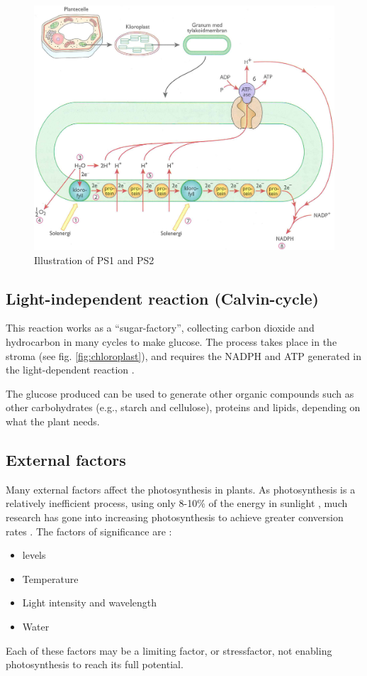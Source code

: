 \begin{figure}
\centering
\includegraphics[width=\textwidth]{img/photosynthesis/light_dependent.png}
\caption{Illustration of PS1 and PS2 \citep{bios}}
\label{fig:photosystem}
\end{figure}

\subsection{Light-independent reaction (Calvin-cycle)}
This reaction works as a “sugar-factory”, collecting carbon dioxide and hydrocarbon in many cycles to make glucose. The process takes place in the stroma (see fig. \ref{fig:chloroplast}), and requires the NADPH and ATP generated in the light-dependent reaction \citep{bi2}. 

The glucose produced can be used to generate other organic compounds such as other carbohydrates (e.g., starch and cellulose), proteins and lipids, depending on what the plant needs.

\subsection{External factors}
Many external factors affect the photosynthesis in plants. As photosynthesis is a relatively inefficient process, using only 8-10\% of the energy in sunlight \citetext{Long et. al, 2006; Zhu et. al, 2010, referenced in \citealp{kirschbaum2011does}}, much research has gone into increasing photosynthesis to achieve greater conversion rates \citetext{Reynolds et al., 2000; Sinclair et al., 2004; Long et al., 2006; Zhu et al., 2010, referenced in \citealp{kirschbaum2011does}}. The factors of significance are \citep{bios}:
\begin{itemize}
\item {} levels
\item Temperature
\item Light intensity and wavelength
\item Water
\end{itemize}
Each of these factors may be a limiting factor, or stressfactor, not enabling photosynthesis to reach its full potential. 

